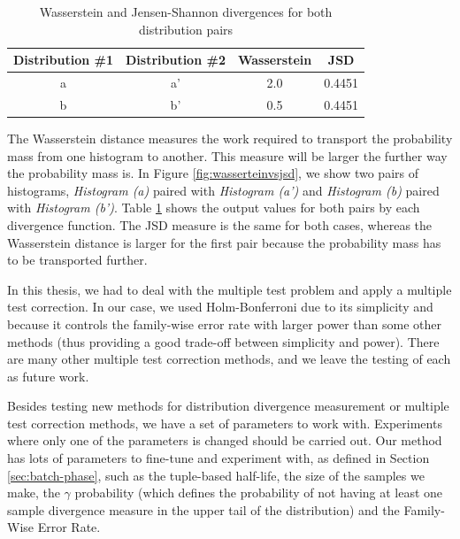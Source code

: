 \documentclass[sigconf]{acmart}
\begin{document}
\begin{table}[!htb]
    \begin{center}
        \begin{tabular}{|c|c|c|c|}
        \hline
        \textbf{Distribution \#1} & \textbf{Distribution \#2} & \textbf{Wasserstein} & \textbf{JSD} \\ \hline
        a                         & a'                        & 2.0                         & 0.4451                         \\ \hline
        b                         & b'                        & 0.5                         & 0.4451                         \\ \hline
        \end{tabular}
    \end{center}
    \caption[Wasserstein and Jensen-Shannon divergences output comparison]{Wasserstein and Jensen-Shannon divergences for both distribution pairs}
    \label{tbl:wassertein-vs-jsd}
\end{table}
The Wasserstein distance measures the work required to transport the probability mass from one histogram to another. This measure will be larger the further way the probability mass is. In Figure \ref{fig:wasserteinvsjsd}, we show two pairs of histograms, \textit{Histogram (a)} paired with \textit{Histogram (a')} and \textit{Histogram (b)} paired with \textit{Histogram (b')}. Table \ref{tbl:wassertein-vs-jsd} shows the output values for both pairs by each divergence function. The JSD measure is the same for both cases, whereas the Wasserstein distance is larger for the first pair because the probability mass has to be transported further.

In this thesis, we had to deal with the multiple test problem and apply a multiple test correction. In our case, we used Holm-Bonferroni due to its simplicity and because it controls the family-wise error rate with larger power than some other methods (thus providing a good trade-off between simplicity and power). There are many other multiple test correction methods, and we leave the testing of each as future work.

Besides testing new methods for distribution divergence measurement or multiple test correction methods, we have a set of parameters to work with. Experiments where only one of the parameters is changed should be carried out. Our method has lots of parameters to fine-tune and experiment with, as defined in Section \ref{sec:batch-phase}, such as the tuple-based half-life, the size of the samples we make, the $\gamma$ probability (which defines the probability of not having at least one sample divergence measure in the upper tail of the distribution) and the Family-Wise Error Rate.
\end{document}
